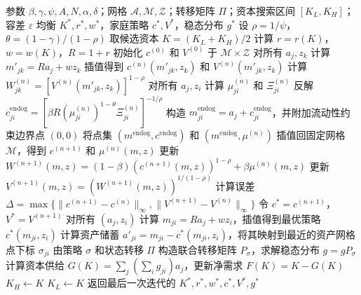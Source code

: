 \documentclass[UTF8,a4paper,12pt]{ctexart}
\newcommand{\R}{R}
\newcommand{\Agrid}{\mathcal{A}}
\newcommand{\Mgrid}{\mathcal{M}}
\newcommand{\Zgrid}{\mathcal{Z}}
\newcommand{\tol}{\varepsilon}
\begin{document}
\begin{algorithm}[h!]
\caption{EGM for Epstein-Zin Aiyagari Equilibrium}
\label{alg:ez-aiyagari-egm}
\begin{algorithmic}[1]
\Require 参数 $\beta,\gamma,\psi,A,N,\alpha,\delta$；网格 $\Agrid,\Mgrid,\Zgrid$；转移矩阵 $\Pi$；资本搜索区间 $[K_L,K_H]$；容差 $\tol$
\Ensure 均衡 $K^\ast,r^\ast,w^\ast$，家庭策略 $c^\ast,V^\ast$，稳态分布 $g^\ast$
\State 设 $\rho=1/\psi$，$\theta=(1-\gamma)/(1-\rho)$
\While{$K_H-K_L>\tol$}
    \State 取候选资本 $K=(K_L+K_H)/2$
    \State 计算 $r=r(K)$，$w=w(K)$，$\R=1+r$
    \State 初始化 $c^{(0)}$ 和 $V^{(0)}$ 于 $\Mgrid\times\Zgrid$
    \Repeat
        \State 对所有 $a_j,z_k$ 计算 $m'_{jk}=\R a_j+wz_k$
        \State 插值得到 $c^{(n)}(m'_{jk},z_k)$ 和 $V^{(n)}(m'_{jk},z_k)$
        \State 计算 $W^{(n)}_{jk}=[V^{(n)}(m'_{jk},z_k)]^{1-\rho}$
        \State 对所有 $a_j,z_i$ 计算 $\mu^{(n)}_{ji}$ 和 $\Xi^{(n)}_{ji}$
        \State 反解 $c^{\mathrm{endog}}_{ji}=[\beta\R(\mu^{(n)}_{ji})^{1-\theta}\Xi^{(n)}_{ji}]^{-1/\rho}$
        \State 构造 $m^{\mathrm{endog}}_{ji}=a_j+c^{\mathrm{endog}}_{ji}$，并附加流动性约束边界点 $(0,0)$
        \State 将点集 $(m^{\mathrm{endog}}, c^{\mathrm{endog}})$ 和 $(m^{\mathrm{endog}}, \mu^{(n)})$ 插值回固定网格 $\Mgrid$，得到 $c^{(n+1)}$ 和 $\mu^{(n)}(m,z)$
        \State 更新 $W^{(n+1)}(m,z)=(1-\beta)(c^{(n+1)}(m,z))^{1-\rho}+\beta\mu^{(n)}(m,z)$
        \State 更新 $V^{(n+1)}(m,z)=(W^{(n+1)}(m,z))^{1/(1-\rho)}$
        \State 计算误差 $\Delta=\max\{\|c^{(n+1)}-c^{(n)}\|_\infty,\|V^{(n+1)}-V^{(n)}\|_\infty\}$
    \Until{$\Delta<\tol$}
    \State 令 $c^\ast=c^{(n+1)}$，$V^\ast=V^{(n+1)}$
    \State 对所有 $(a_j,z_i)$ 计算 $m_{ji}=\R a_j+wz_i$，插值得到最优策略 $c^\ast(m_{ji},z_i)$
    \State 计算资产储蓄 $a'_{ji}=m_{ji}-c^\ast(m_{ji},z_i)$，将其映射到最近的资产网格点下标 $\sigma_{ji}$
    \State 由策略 $\sigma$ 和状态转移 $\Pi$ 构造联合转移矩阵 $P_\sigma$，求解稳态分布 $g=gP_\sigma$
    \State 计算资本供给 $G(K)=\sum_j(\sum_i g_{ji})a_j$，更新净需求 $F(K)=K-G(K)$
        \State $K_H\gets K$  
    \Else
        \State $K_L\gets K$  
    \EndIf
\EndWhile
\State 返回最后一次迭代的 $K^\ast,r^\ast,w^\ast,c^\ast,V^\ast,g^\ast$
\end{algorithmic}
\end{algorithm}
\end{document}
